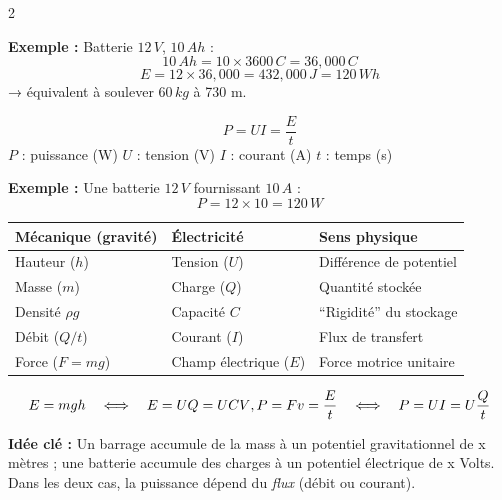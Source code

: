 \documentclass[a4paper,10pt,landscape]{article}
\begin{document}
\begin{multicols}{2}
\begin{tcolorbox}[cheatbox,title={\color{elecred}Énergie potentielle électrique (batterie)}]
\textbf{Exemple :}  
Batterie $12\,\si{V}$, $10\,\si{Ah}$ :  
\[
10\,\si{Ah} = 10 \times 3600\,\si{C} = 36{,}000\,\si{C}
\]
\[
E = 12 \times 36{,}000 = 432{,}000\,\si{J} = 120\,\si{Wh}
\]
→ équivalent à soulever $60\,\si{kg}$ à 730 m.
\end{tcolorbox}


\begin{tcolorbox}[cheatbox,title={\color{elecred}Puissance électrique}]
\[
P = U I = \frac{E}{t}
\]
$P$ : puissance (\si{W}) \quad
$U$ : tension (\si{V}) \quad
$I$ : courant (\si{A}) \quad
$t$ : temps (\si{s})

\textbf{Exemple :}  
Une batterie $12\,\si{V}$ fournissant $10\,\si{A}$ :  
\[
P = 12 \times 10 = 120\,\si{W}
\]
\end{tcolorbox}

\end{multicols}



\begin{tcolorbox}[cheatbox, title={\color{elecred}Analogie mécanique – électrique}, width=0.97\textwidth]
\begin{center}
\begin{tabular}{lll}
\textbf{Mécanique (gravité)} & \textbf{Électricité} & \textbf{Sens physique}\\
\hline
Hauteur ($h$) & Tension ($U$) & Différence de potentiel\\
Masse ($m$) & Charge ($Q$) & Quantité stockée\\
Densité $\rho g$ & Capacité $C$ & “Rigidité” du stockage\\
Débit ($Q/t$) & Courant ($I$) & Flux de transfert\\
Force ($F = m g$) & Champ électrique ($E$) & Force motrice unitaire\\
\end{tabular}
\end{center}

\vspace{6pt}
\[
E = m g h \quad\Longleftrightarrow\quad E = U Q = U C V \\, 
P = F v = \frac{E}{t} \quad\Longleftrightarrow\quad P = U I = U \frac{Q}{t}
\]

\textbf{Idée clé :}  
Un barrage accumule de la mass à un potentiel gravitationnel de x mètres ;  
une batterie accumule des charges à un potentiel électrique de x Volts.  
Dans les deux cas, la puissance dépend du \textit{flux} (débit ou courant).
\end{tcolorbox}
\end{document}
